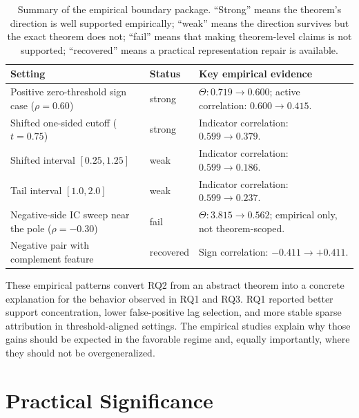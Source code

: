 \begin{table}[H]
    \caption[RQ2 empirical boundary-condition summary.]{Summary of the empirical boundary package. ``Strong'' means the theorem's direction is well supported empirically; ``weak'' means the direction survives but the exact theorem does not; ``fail'' means that making theorem-level claims is not supported; ``recovered'' means a practical representation repair is available.}
    \label{tab:rq2_boundary_summary}
    \begin{center}
        \begin{tabular}{p{}p{}p{}}
            Setting & Status & Key empirical evidence \\ \hline
            Positive zero-threshold sign case ($\rho=0.60$) & strong & $\Theta: 0.719 \rightarrow 0.600$; active correlation: $0.600 \rightarrow 0.415$. \\ \hline
            Shifted one-sided cutoff ($t=0.75$) & strong & Indicator correlation: $0.599 \rightarrow 0.379$. \\ \hline
            Shifted interval $[0.25,1.25]$ & weak & Indicator correlation: $0.599 \rightarrow 0.186$. \\ \hline
            Tail interval $[1.0,2.0]$ & weak & Indicator correlation: $0.599 \rightarrow 0.237$. \\ \hline
            Negative-side IC sweep near the pole ($\rho=-0.30$) & fail & $\Theta: 3.815 \rightarrow 0.562$; empirical only, not theorem-scoped. \\ \hline
            Negative pair with complement feature & recovered & Sign correlation: $-0.411 \rightarrow +0.411$. \\ \hline
        \end{tabular}
    \end{center}
\end{table}

These empirical patterns convert RQ2 from an abstract theorem into a concrete explanation for the behavior observed in RQ1 and RQ3. RQ1 reported better support concentration, lower false-positive lag selection, and more stable sparse attribution in threshold-aligned settings. The empirical studies explain why those gains should be expected in the favorable regime and, equally importantly, where they should not be overgeneralized.

\section{Practical Significance}


